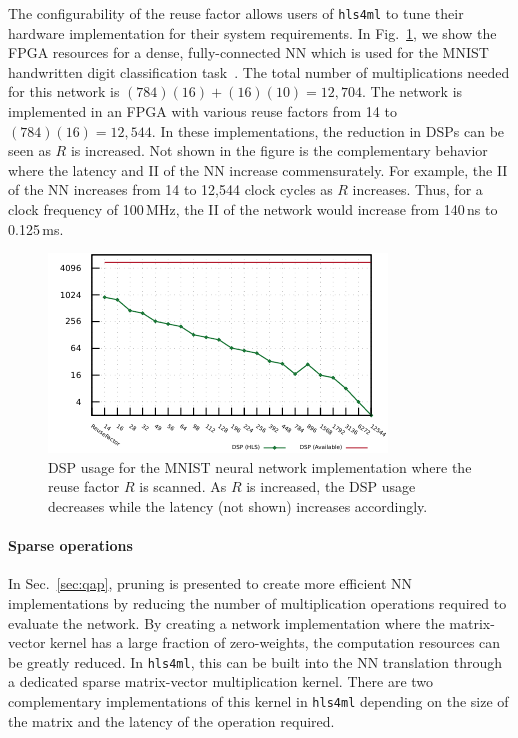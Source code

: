 \documentclass[sigconf]{acmart}
\newcommand{\hlsfml}{\texttt{hls4ml}\xspace}
\begin{document}
The configurability of the reuse factor allows users of \hlsfml to tune their hardware implementation for their system requirements. 
In Fig.~\ref{fig:largeR}, we show the FPGA resources for a dense, fully-connected NN which is used for the MNIST handwritten digit classification task~\cite{MNIST}.
The total number of multiplications needed for this network is $(784)(16) + (16)(10) = 12,704$.
The network is implemented in an FPGA with various reuse factors from 14 to $(784)(16)=12,544$.  
In these implementations, the reduction in DSPs can be seen as $R$ is increased.  
Not shown in the figure is the complementary behavior where the latency and II of the NN increase commensurately.  
For example, the II of the NN increases from 14 to 12,544 clock cycles as $R$ increases.
Thus, for a clock frequency of 100\,MHz, the II of the network would increase from 140\,ns to 0.125\,ms.

\begin{figure}[t!]
\begin{center}
\includegraphics[width=0.9\columnwidth]{Figs/largeReuse.pdf}
\end{center}
\caption{DSP usage for the MNIST neural network implementation where the reuse factor $R$ is scanned. 
As $R$ is increased, the DSP usage decreases while the latency (not shown) increases accordingly.}
\label{fig:largeR}
\end{figure}

\paragraph{Sparse operations}

In Sec.~\ref{sec:qap}, pruning is presented to create more efficient NN implementations by reducing the number of multiplication operations required to evaluate the network.
By creating a network implementation where the matrix-vector kernel has a large fraction of zero-weights, the computation resources can be greatly reduced.  
In \hlsfml, this can be built into the NN translation through a dedicated sparse matrix-vector multiplication kernel.  
There are two complementary implementations of this kernel in \hlsfml depending on the size of the matrix and the latency of the operation required.  
\end{document}

